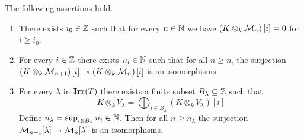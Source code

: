 \begin{lemma}\label{lemma:boundedness_of_gradation_and_two_stabilizations}
The following assertions hold.
\begin{enumerate}[label=\emph{\textbf{(\arabic*)}}, leftmargin=3.0em]
\item There exists $i_0\in {\mathbb Z}$ such that for every $n\in {\mathbb N}$ we have $\left(K\otimes_k{\mathcal M}_n\right)[i] = 0$ for $i \geq i_0$.
\item For every $i\in {\mathbb Z}$ there exists $n_i\in {\mathbb N}$ such that for all $n\geq n_i$ the surjection $\left(K\otimes_k{\mathcal M}_{n+1}\right)[i]\twoheadrightarrow \left(K\otimes_k{\mathcal M}_n\right)[i]$ is an isomorphisms.
\item For every $\lambda$ in $\mathbf{Irr}(T)$ there exists a finite subset $B_{\lambda}\subseteq {\mathbb Z}$ such that
$$K\otimes_k V_{\lambda} = \bigoplus_{i\in B_{\lambda}}\left(K\otimes_k V_{\lambda}\right)[i]$$
Define $n_{\lambda} = \sup_{i\in B_{\lambda}}n_i \in {\mathbb N}$. Then for all $n\geq n_{\lambda}$ the surjection ${\mathcal M}_{n+1}[\lambda]\twoheadrightarrow {\mathcal M}_n[\lambda]$ is an isomorphisms.
\end{enumerate}
\end{lemma}
